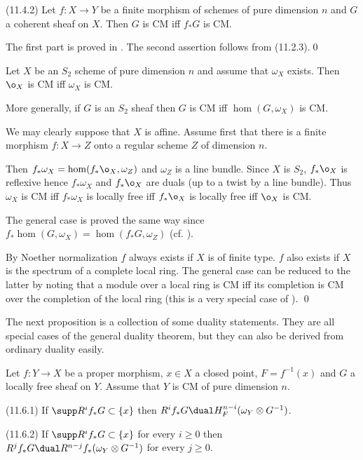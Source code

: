 (11.4.2)  Let $f:X\to Y $ be a finite morphism of  schemes of pure
dimension
$n$ and
$G$ a coherent sheaf on $X$. Then $G$ is CM iff $f_*G$ is CM.
\endproclaim

\demop   The first part is proved in \cite{Matsumura86, 19.1}.
The second assertion follows from (11.2.3).\qed\enddemo


 Let $X$ be an $S_2$  scheme of pure dimension $n$ and
assume that $\omega_X$ exists. Then $\o_X$ is CM iff $\omega_X$ is CM. 

More generally, if $G$ is an $S_2$ sheaf then $G$ is CM iff $\hom
(G,\omega_X)$ is CM.
\endproclaim

\demop We may clearly suppose that $X$ is affine. Assume first that
there is a finite morphism $f:X\to Z$ onto a regular scheme $Z$ of dimension
$n$. 

Then $f_*\omega_X=\hom(f_*\o_X,\omega_Z)$ and $\omega_Z$ is a line bundle. 
Since $X$ is $S_2$, $f_*\o_X$ is reflexive hence 
$f_*\omega_X$ and $f_*\o_X$ are duals (up to a twist by a line bundle). 
Thus $\omega_X$ is CM iff $f_*\omega_X$ is locally free iff  $f_*\o_X$
is locally free iff $\o_X$ is CM.

The   general case is proved the same way since 
$f_*\hom (G,\omega_X)=\hom(f_*G,\omega_Z)$
(cf. \cite{Hartshorne77, Exercise III.6.10}). 



By Noether normalization $f$ always exists  if $X$ is of
finite type. 
$f$ also exists if $X$ is the spectrum of a complete local ring.
The general case can be reduced to the latter by noting that a module over a
local ring is CM iff its completion is CM over the completion of the local
ring (this is a very special case of \cite{Matsumura86, 23.3}). \qed\enddemo

The next proposition is a collection of some duality statements. They are all
special cases of the general duality theorem, but they can also be derived from
ordinary duality easily.



  Let $f:Y\to X$ be a proper morphism, $x\in X$ a closed
point, $F=f^{-1}(x)$ and $G$ a locally free sheaf on $Y$.  Assume  
that
$Y$ is CM of pure dimension $n$. 

(11.6.1) If $\supp R^if_*G\subset \{x\}$ then
$R^if_*G \dual H^{n-i}_F(\omega_Y\otimes G^{-1})$.

(11.6.2) If $\supp R^if_*G\subset \{x\}$ for every $i\geq 0$ then
$R^jf_*G \dual R^{n-j}f_*(\omega_Y\otimes G^{-1})$ for every $j\geq 0$.

